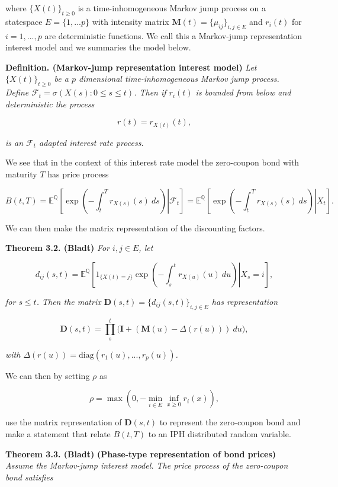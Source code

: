 \documentclass[a4paper,12pt,openany]{book}
\begin{document}
where \(\{X(t)\}_{t\ge 0}\) is a time-inhomogeneous Markov jump process on a statespace \(E=\{1,...p\}\) with intensity matrix \(\mathbf M(t)=\{\mu_{ij}\}_{i,j\in E}\) and \(r_i(t)\) for \(i=1,...,p\) are deterministic functions. We call this a Markov-jump representation interest model and we summaries the model below.

\textbf{Definition. (Markov-jump representation interest model)} \emph{Let \(\{X(t)\}_{t\ge 0}\) be a \(p\) dimensional time-inhomogeneous Markov jump process. Define \(\mathcal F_t=\sigma(X(s) : 0\le s\le t)\). Then if \(r_i(t)\) is bounded from below and deterministic the process}

\[
r(t)=r_{X(t)}(t),
\]

\emph{is an \(\mathcal F_t\) adapted interest rate process.}

We see that in the context of this interest rate model the zero-coupon bond with maturity \(T\) has price process

\[
B(t,T)=\mathbb E^{\mathbb Q}\left[\left.\exp\left(-\int_t^Tr_{X(s)}(s)\ ds\right) \right\vert \mathcal F_t\right]=\mathbb E^{\mathbb Q}\left[\left.\exp\left(-\int_t^Tr_{X(s)}(s)\ ds\right) \right\vert X_t\right].
\]

We can then make the matrix representation of the discounting factors.

\textbf{Theorem 3.2. (Bladt)} \emph{For \(i,j\in E\), let}

\[
d_{ij}(s,t)=\mathbb E^{\mathbb Q}\left[\left.1_{\{X(t)=j\}}\exp\left(-\int_s^tr_{X(u)}(u)\ du\right) \right\vert X_s=i\right],
\]

\emph{for \(s\le t\). Then the matrix \(\mathbf D(s,t)=\{d_{ij}(s,t)\}_{i,j\in E}\) has representation}

\[
\mathbf D(s,t)=\prod_s^t\Big(\mathbf I+(\mathbf M(u)-\Delta (r(u)))\ du\Big),
\]

\emph{with \(\Delta(r(u))=\text{diag}(r_1(u),...,r_p(u))\).}

We can then by setting \(\rho\) as

\[
\rho=\max\left(0,-\min_{i\in E}\inf_{x\ge 0}r_i(x)\right),
\]

use the matrix representation of \(\mathbf D(s,t)\) to represent the zero-coupon bond and make a statement that relate \(B(t,T)\) to an IPH distributed random variable.

\textbf{Theorem 3.3. (Bladt)} \textbf{(Phase-type representation of bond prices)} \emph{Assume the Markov-jump interest model. The price process of the zero-coupon bond satisfies}
\end{document}
